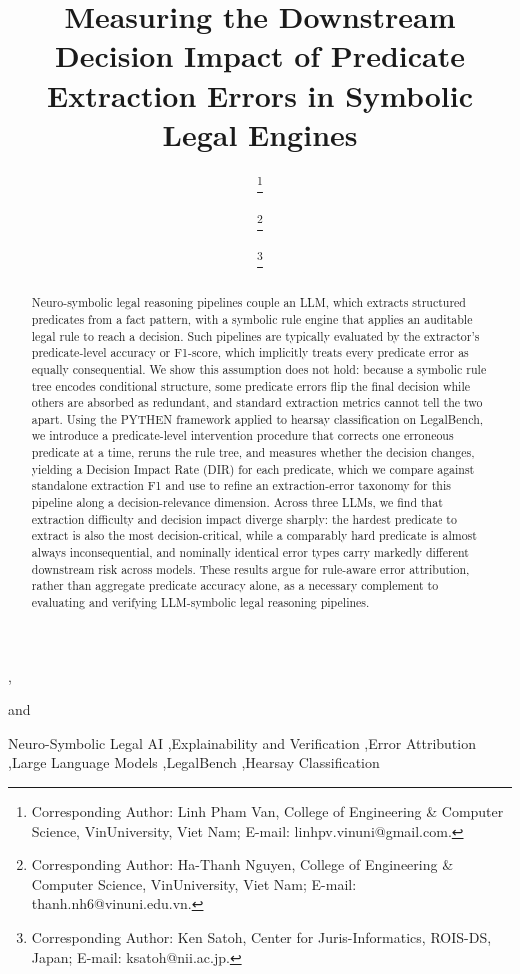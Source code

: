 \documentclass{IOS-Book-Article}
\begin{document}
\begin{frontmatter}

\title{Measuring the Downstream Decision Impact of Predicate Extraction Errors in Symbolic Legal Engines}

\author[A]{ %
\thanks{Corresponding Author: Linh Pham Van, College of Engineering \& Computer Science, VinUniversity, Viet Nam; E-mail: linhpv.vinuni@gmail.com.}},
\author[A]{ %
\thanks{Corresponding Author: Ha-Thanh Nguyen, College of Engineering \& Computer Science, VinUniversity, Viet Nam; E-mail: thanh.nh6@vinuni.edu.vn.}}
and
\author[B]{ %
\thanks{Corresponding Author: Ken Satoh, Center for Juris-Informatics, ROIS-DS, Japan; E-mail: ksatoh@nii.ac.jp.}}

\address[A]{College of Engineering \& Computer Science, VinUniversity, Viet Nam}
\address[B]{Center for Juris-Informatics, ROIS-DS, Japan}

\begin{abstract}
Neuro-symbolic legal reasoning pipelines couple an LLM, which extracts structured predicates from a fact pattern, with a symbolic rule engine that applies an auditable legal rule to reach a decision. Such pipelines are typically evaluated by the extractor's predicate-level accuracy or F1-score, which implicitly treats every predicate error as equally consequential. We show this assumption does not hold: because a symbolic rule tree encodes conditional structure, some predicate errors flip the final decision while others are absorbed as redundant, and standard extraction metrics cannot tell the two apart. Using the PYTHEN framework applied to hearsay classification on LegalBench, we introduce a predicate-level intervention procedure that corrects one erroneous predicate at a time, reruns the rule tree, and measures whether the decision changes, yielding a Decision Impact Rate (DIR) for each predicate, which we compare against standalone extraction F1 and use to refine an extraction-error taxonomy for this pipeline along a decision-relevance dimension. Across three LLMs, we find that extraction difficulty and decision impact diverge sharply: the hardest predicate to extract is also the most decision-critical, while a comparably hard predicate is almost always inconsequential, and nominally identical error types carry markedly different downstream risk across models. These results argue for rule-aware error attribution, rather than aggregate predicate accuracy alone, as a necessary complement to evaluating and verifying LLM-symbolic legal reasoning pipelines.
\end{abstract}

\begin{keyword}
Neuro-Symbolic Legal AI \sep Explainability and Verification \sep Error Attribution \sep Large Language Models \sep LegalBench \sep Hearsay Classification
\end{keyword}

\end{frontmatter}
\end{document}
